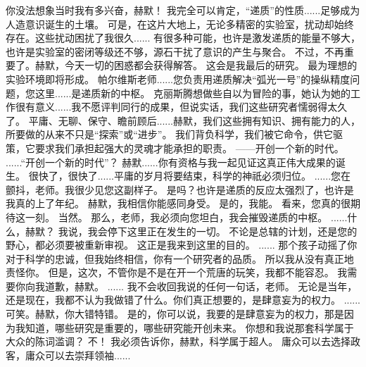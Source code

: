 \documentclass[openany]{book}
\begin{document}
\begin{dialogue}
     你没法想象当时我有多兴奋，赫默！
     我完全可以肯定，“递质”的性质......足够成为人造意识诞生的土壤。
     可是，在这片大地上，无论多精密的实验室，扰动却始终存在。这些扰动困扰了我很久......
     有很多种可能，也许是激发递质的能量不够大，也许是实验室的密闭等级还不够，源石干扰了意识的产生与聚合。
     不过，不再重要了。赫默，今天一切的困惑都会获得解答。
     这会是我最后的研究。
     最为理想的实验环境即将形成。
     帕尔维斯老师......您负责用递质解决“弧光一号”的操纵精度问题，您这里......是递质新的中枢。
     克丽斯腾想做些自以为冒险的事，她认为她的工作很有意义......我不愿评判同行的成果，但说实话，我们这些研究者懦弱得太久了。
     平庸、无聊、保守、瞻前顾后......赫默，我们这些拥有知识、拥有能力的人，所要做的从来不只是“探索”或“进步”。
     我们背负科学，我们被它命令，供它驱策，它要求我们承担起强大的灵魂才能承担的职责。
     ——开创一个新的时代。
     ......“开创一个新的时代”？
     赫默......你有资格与我一起见证这真正伟大成果的诞生。
     很快了，很快了......平庸的岁月将要结束，科学的神祇必须归位。
     ......您在颤抖，老师。我很少见您这副样子。
     是吗？也许是递质的反应太强烈了，也许是我真的上了年纪。
     赫默，我相信你能感同身受。
     是的，我能。
     看来，您真的很期待这一刻。
     当然。
     那么，老师，我必须向您坦白，我会摧毁递质的中枢。
     ......什么，赫默？
     我说，我会停下这里正在发生的一切。
     不论是总辖的计划，还是您的野心，都必须要被重新审视。
     这正是我来到这里的目的。
     ......
     那个孩子动摇了你对于科学的忠诚，但我始终相信，你有一个研究者的品质。
     所以我从没有真正地责怪你。
     但是，这次，不管你是不是在开一个荒唐的玩笑，我都不能容忍。
     我需要你向我道歉，赫默。
     ......
     我不会收回我说的任何一句话，老师。
     无论是当年，还是现在，我都不认为我做错了什么。你们真正想要的，是肆意妄为的权力。
     ......可笑。赫默，你大错特错。
     是的，你可以说，我要的是肆意妄为的权力，那是因为我知道，哪些研究是重要的，哪些研究能开创未来。
     你想和我说那套科学属于大众的陈词滥调？
     不！
     我必须告诉你，赫默，科学属于超人。
     庸众可以去选择政客，庸众可以去崇拜领袖......

\end{dialogue}
\end{document}
